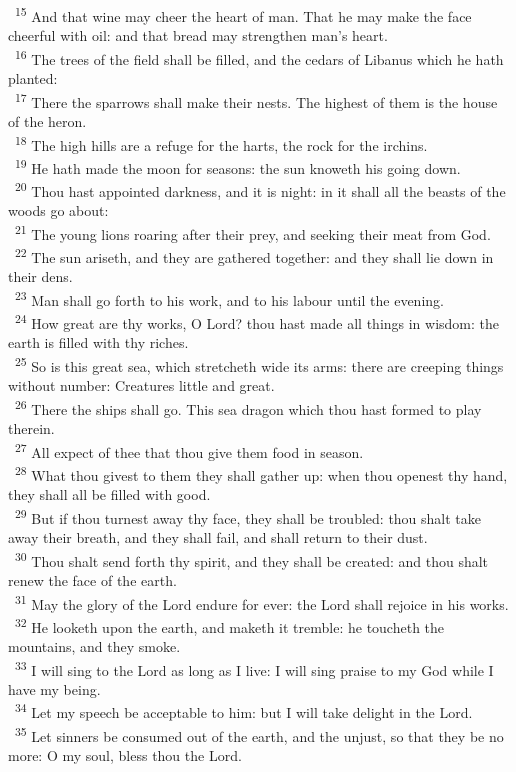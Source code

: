 \documentclass[a5paper,12pt]{article}
\begin{document}
\begin{multicols*}{2}
~\textsuperscript{15} And that wine may cheer the heart of man. That he may make the face cheerful with oil: and that bread may strengthen man's heart.\\
~\textsuperscript{16} The trees of the field shall be filled, and the cedars of Libanus which he hath planted:\\
~\textsuperscript{17} There the sparrows shall make their nests. The highest of them is the house of the heron.\\
~\textsuperscript{18} The high hills are a refuge for the harts, the rock for the irchins.\\
~\textsuperscript{19} He hath made the moon for seasons: the sun knoweth his going down.\\
~\textsuperscript{20} Thou hast appointed darkness, and it is night: in it shall all the beasts of the woods go about:\\
~\textsuperscript{21} The young lions roaring after their prey, and seeking their meat from God.\\
~\textsuperscript{22} The sun ariseth, and they are gathered together: and they shall lie down in their dens.\\
~\textsuperscript{23} Man shall go forth to his work, and to his labour until the evening.\\
~\textsuperscript{24} How great are thy works, O Lord? thou hast made all things in wisdom: the earth is filled with thy riches.\\
~\textsuperscript{25} So is this great sea, which stretcheth wide its arms: there are creeping things without number: Creatures little and great.\\
~\textsuperscript{26} There the ships shall go. This sea dragon which thou hast formed to play therein.\\
~\textsuperscript{27} All expect of thee that thou give them food in season.\\
~\textsuperscript{28} What thou givest to them they shall gather up: when thou openest thy hand, they shall all be filled with good.\\
~\textsuperscript{29} But if thou turnest away thy face, they shall be troubled: thou shalt take away their breath, and they shall fail, and shall return to their dust.\\
~\textsuperscript{30} Thou shalt send forth thy spirit, and they shall be created: and thou shalt renew the face of the earth.\\
~\textsuperscript{31} May the glory of the Lord endure for ever: the Lord shall rejoice in his works.\\
~\textsuperscript{32} He looketh upon the earth, and maketh it tremble: he toucheth the mountains, and they smoke.\\
~\textsuperscript{33} I will sing to the Lord as long as I live: I will sing praise to my God while I have my being.\\
~\textsuperscript{34} Let my speech be acceptable to him: but I will take delight in the Lord.\\
~\textsuperscript{35} Let sinners be consumed out of the earth, and the unjust, so that they be no more: O my soul, bless thou the Lord.\\


\end{multicols*}
\end{document}
